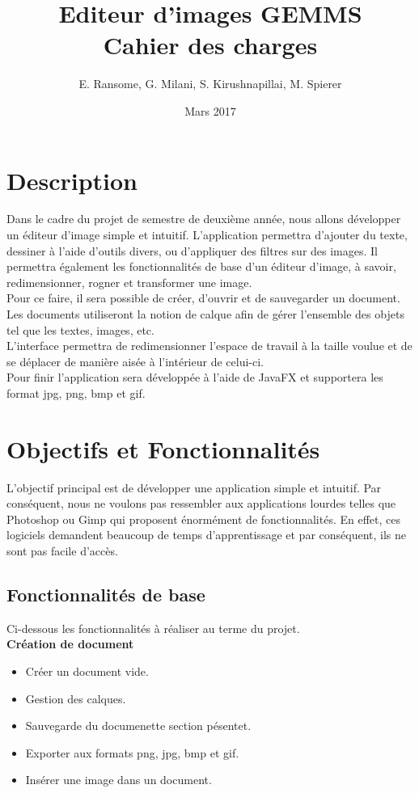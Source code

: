 \documentclass[11pt, a4paper, french]{article}
\title{Editeur d'images GEMMS \\ Cahier des charges}
\author{E. Ransome, G. Milani, S. Kirushnapillai, M. Spierer}
\date{Mars 2017}
\begin{document}
	\maketitle
	\thispagestyle{empty}
	\tableofcontents
	\pagebreak

	\section{Description}
		Dans le cadre du projet de semestre de deuxième année, nous allons développer un éditeur d'image simple et intuitif. L'application permettra d'ajouter du texte, dessiner à l'aide d'outils divers, ou d'appliquer des filtres sur des images. Il permettra également les fonctionnalités de base d'un éditeur d'image, à savoir, redimensionner, rogner et transformer une image. \\
		
		Pour ce faire, il sera possible de créer, d'ouvrir et de sauvegarder un document. Les documents utiliseront la notion de calque afin de gérer l'ensemble des objets tel que les textes, images, etc. \\
		
		L’interface permettra de redimensionner l’espace de travail à la taille voulue et de se déplacer de manière aisée à l’intérieur de celui-ci. \\
		
		Pour finir l’application sera développée à l’aide de JavaFX et supportera les format jpg, png, bmp et gif.
	
	\section{Objectifs et Fonctionnalités}

		L'objectif principal est de développer une application simple et intuitif. Par conséquent, nous ne voulons pas ressembler aux applications lourdes telles que Photoshop ou Gimp qui proposent énormément de fonctionnalités. En effet, ces logiciels demandent beaucoup de temps d'apprentissage et par conséquent, ils ne sont pas facile d'accès. 
		 
		\subsection{Fonctionnalités de base}
			
			Ci-dessous les fonctionnalités à réaliser au terme du projet.\\
			
			\textbf{Création de document}
			\begin{itemize}[label=\textbullet]
				\item Créer un document vide.
				\item Gestion des calques.
				\item Sauvegarde du documenette section pésentet.
				\item Exporter aux formats png, jpg, bmp et gif.
				\item Insérer une image dans un document. \\
			\end{itemize}
		
\end{document}
